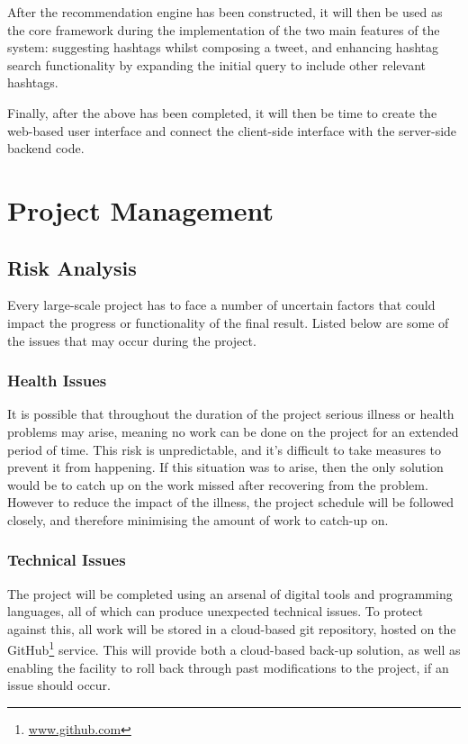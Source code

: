 \documentclass[12pt,a4paper]{article}
\begin{document}
After the recommendation engine has been constructed, it will then be used as the core framework during the implementation of the two main features of the system: suggesting hashtags whilst composing a tweet, and enhancing hashtag search functionality by expanding the initial query to include other relevant hashtags.

Finally, after the above has been completed, it will then be time to create the web-based user interface and connect the client-side interface with the server-side backend code.

\pagebreak

\section{Project Management}
\subsection{Risk Analysis}
Every large-scale project has to face a number of uncertain factors that could impact the progress or functionality of the final result. Listed below are some of the issues that may occur during the project.

\subsubsection{Health Issues}
It is possible that throughout the duration of the project serious illness or health problems may arise, meaning no work can be done on the project for an extended period of time. This risk is unpredictable, and it's difficult to take measures to prevent it from happening. If this situation was to arise, then the only solution would be to catch up on the work missed after recovering from the problem. However to reduce the impact of the illness, the project schedule will be followed closely, and therefore minimising the amount of work to catch-up on.

\subsubsection{Technical Issues}
The project will be completed using an arsenal of digital tools and programming languages, all of which can produce unexpected technical issues. To protect against this, all work will be stored in a cloud-based git repository, hosted on the GitHub\footnote{\url{www.github.com}} service. This will provide both a cloud-based back-up solution, as well as enabling the facility to roll back through past modifications to the project, if an issue should occur.
\end{document}
